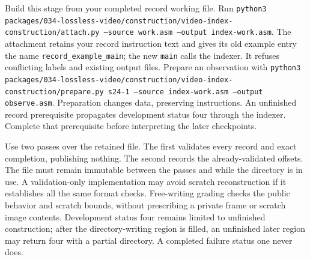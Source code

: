 Build this stage from your completed record working file. Run
\texttt{python3 packages/034-lossless-video/construction/video-index-construction/attach.py --source work.asm
  --output index-work.asm}. The attachment retains your record instruction text
and gives its old example entry the name \texttt{record\_example\_main}; the
new \texttt{main} calls the indexer. It refuses conflicting labels and existing
output files. Prepare an observation with
\texttt{python3 packages/034-lossless-video/construction/video-index-construction/prepare.py s24-1 --source
  index-work.asm --output observe.asm}. Preparation changes data, preserving
instructions. An unfinished record prerequisite propagates development status
four through the indexer. Complete that prerequisite before interpreting the
later checkpoints.

Use two passes over the retained file. The first validates every record and exact
completion, publishing nothing. The second records the already-validated offsets.
The file must remain immutable between the passes and while the directory is in
use. A validation-only implementation may avoid scratch reconstruction if it
establishes all the same format checks. Free-writing grading checks the public
behavior and scratch bounds, without prescribing a private frame or scratch image
contents. Development status four remains limited to unfinished construction;
after the directory-writing region is filled, an unfinished later region may
return four with a partial directory. A completed failure status one never does.
